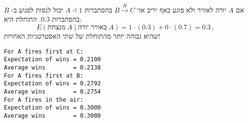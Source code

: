 אם
$A$
יורה לאוויר ולא פוגע באף יריב אזי
$B\stackrel{H}{\longrightarrow}C$
בהסתברות 
$1$
ו-%
$A$
יכול לנסות לפגוע ב-%
$B$
בהסתברות
$0.3$.
התוחלת היא:
\[
E(\textrm{מנצחת}\;A\;|\;\textrm{באוויר יורה}\;A) = 1\cdot(0.3) + 0\cdot(0.7)=0.3\,,
\]
שהיא גבוהה יותר מהתוחלת של שתי האסטרטגיות האחרות!

\sml{}

\begin{verbatim}
For A fires first at C:
Expectation of wins = 0.2100
Average wins        = 0.2138
For A fires first at B:
Expectation of wins = 0.2792
Average wins        = 0.2754
For A fires in the air:
Expectation of wins = 0.3000
Average wins        = 0.3000
\end{verbatim}

